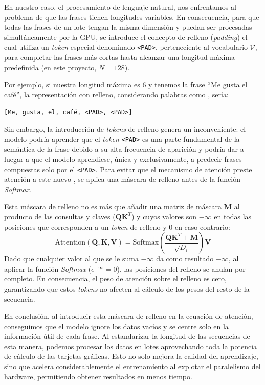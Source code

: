 En nuestro caso, el procesamiento de lenguaje natural, nos enfrentamos al problema de que las frases tienen longitudes variables. En consecuencia, 
para que todas las frases de un lote tengan la misma dimensión y puedan ser procesadas simultáneamente por la GPU, se introduce el concepto de 
relleno (\textit{padding}) el cual utiliza un \textit{token} especial denominado \texttt{<PAD>}, perteneciente al vocabulario $\mathcal{V}$, 
para completar las frases más cortas hasta alcanzar una longitud máxima predefinida (en este proyecto, $N = 128$).

Por ejemplo, si nuestra longitud máxima es 6 y tenemos la frase ``Me gusta el café'', la representación con relleno, considerando palabras 
como \tokens{}, sería:
\begin{center}
    \texttt{[Me, gusta, el, café, <PAD>, <PAD>]}
\end{center}


Sin embargo, la introducción de \textit{tokens} de relleno genera un inconveniente: el modelo podría aprender que el \textit{token} \texttt{<PAD>} 
es una parte fundamental de la semántica de la frase debido a su alta frecuencia de aparición y podría dar a  luegar a que el modelo aprendiese, 
única y exclusivamente, a predecir frases compuestas solo por el \token{} \texttt{<PAD>}. Para evitar que el mecanismo de atención preste atención 
a este nuevo \token{}, se aplica una máscara de relleno antes de la función \textit{Softmax}.

Esta máscara de relleno no es más que  añadir una matriz de máscara $\textbf{M}$ al producto de las consultas y claves ($\mathbf{Q}\mathbf{K}^T$) 
y cuyos valores son  $-\infty$ en todas las posiciones que corresponden a un \textit{token} de relleno y $0$ en caso contrario:
\begin{equation}
    \text{Attention}(\mathbf{Q}, \mathbf{K}, \mathbf{V}) = \text{Softmax} \left( \frac{\mathbf{Q} \mathbf{K}^T + \textbf{M}}{\sqrt{D_i}} \right) 
    \mathbf{V}
\end{equation}
Dado que cualquier valor al que se le suma $-\infty$ da como resultado $-\infty$, al aplicar la función \textit{Softmax} ($e^{-\infty} = 0$), 
las posiciones del relleno se anulan por completo. En consecuencia, el peso de atención sobre el relleno es cero, garantizando que estos 
\textit{tokens} no afecten al cálculo de los pesos del resto de la secuencia.

En conclusión, al introducir esta máscara de relleno en la ecuación de atención, conseguimos que el modelo ignore los datos vacíos y se centre 
solo en la información útil de cada frase. Al estandarizar la longitud de las secuencias de esta manera, podemos procesar los datos en lotes 
aprovechando toda la potencia de cálculo de las tarjetas gráficas. Esto no solo mejora la calidad del aprendizaje, sino que acelera 
considerablemente el entrenamiento al explotar el paralelismo del hardware, permitiendo obtener resultados en  menos tiempo.



